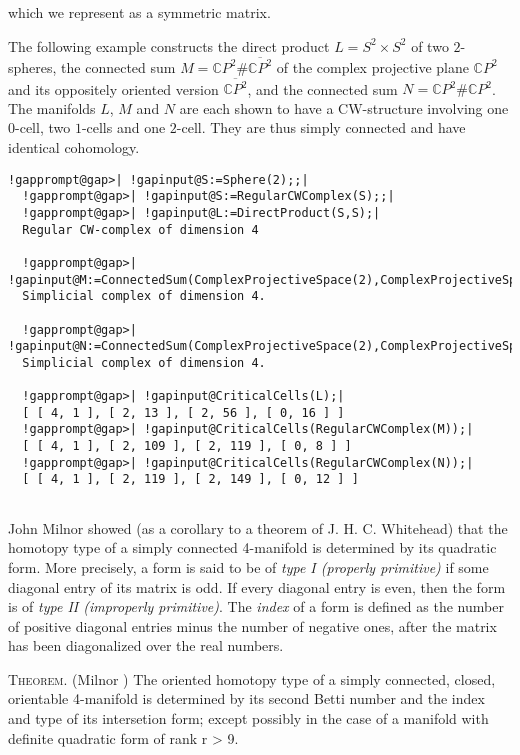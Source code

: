 \documentclass[a4paper,11pt]{report}
\begin{document}
{{which we represent as a symmetric matrix. 

The following example constructs the direct product $L=S^2\times S^2$ of two $2$-spheres, the connected sum $M=\mathbb CP^2 \# \overline{\mathbb CP^2}$ of the complex projective plane $\mathbb CP^2$ and its oppositely oriented version $\overline{\mathbb CP^2}$, and the connected sum $N=\mathbb CP^2 \# \mathbb CP^2$. The manifolds $L$, $M$ and $N$ are each shown to have a CW-structure involving one $0$-cell, two $1$-cells and one $2$-cell. They are thus simply connected and have identical cohomology. 
\begin{Verbatim}[commandchars=!@|,fontsize=\small,frame=single,label=Example]
  !gapprompt@gap>| !gapinput@S:=Sphere(2);;|
  !gapprompt@gap>| !gapinput@S:=RegularCWComplex(S);;|
  !gapprompt@gap>| !gapinput@L:=DirectProduct(S,S);|
  Regular CW-complex of dimension 4
  
  !gapprompt@gap>| !gapinput@M:=ConnectedSum(ComplexProjectiveSpace(2),ComplexProjectiveSpace(2),-1);|
  Simplicial complex of dimension 4.
  
  !gapprompt@gap>| !gapinput@N:=ConnectedSum(ComplexProjectiveSpace(2),ComplexProjectiveSpace(2),+1);|
  Simplicial complex of dimension 4.
  
  !gapprompt@gap>| !gapinput@CriticalCells(L);|
  [ [ 4, 1 ], [ 2, 13 ], [ 2, 56 ], [ 0, 16 ] ]
  !gapprompt@gap>| !gapinput@CriticalCells(RegularCWComplex(M));|
  [ [ 4, 1 ], [ 2, 109 ], [ 2, 119 ], [ 0, 8 ] ]
  !gapprompt@gap>| !gapinput@CriticalCells(RegularCWComplex(N));|
  [ [ 4, 1 ], [ 2, 119 ], [ 2, 149 ], [ 0, 12 ] ]
  
\end{Verbatim}
 John Milnor showed (as a corollary to a theorem of J. H. C. Whitehead) that
the homotopy type of a simply connected 4-manifold is determined by its
quadratic form. More precisely, a form is said to be of \emph{type I (properly primitive)} if some diagonal entry of its matrix is odd. If every diagonal entry is even,
then the form is of \emph{type II (improperly primitive)}. The \emph{index} of a form is defined as the number of positive diagonal entries minus the
number of negative ones, after the matrix has been diagonalized over the real
numbers. 

\textsc{Theorem.} (Milnor \cite{milnor}) The oriented homotopy type of a simply connected, closed, orientable
4-manifold is determined by its second Betti number and the index and type of
its intersetion form; except possibly in the case of a manifold with definite
quadratic form of rank r {\textgreater} 9. 

}}
\end{document}

